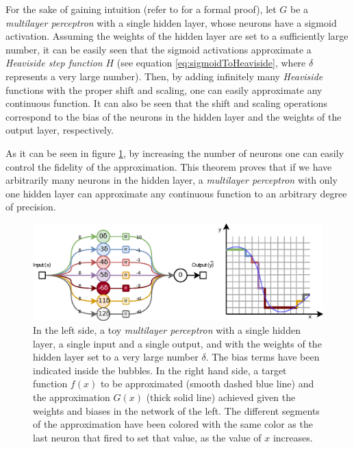 For the sake of gaining intuition (refer to \citealp{Cybenko1989} for a formal proof), let $G$ be a \textit{multilayer perceptron} with a single hidden layer, whose neurons have a sigmoid activation. Assuming the weights of the hidden layer are set to a sufficiently large number, it can be easily seen that the sigmoid activations approximate a \textit{Heaviside step function} $H$ (see equation \ref{eq:sigmoidToHeaviside}, where $\delta$ represents a very large number). Then, by adding infinitely many \textit{Heaviside} functions with the proper shift and scaling, one can easily approximate any continuous function. It can also be seen that the shift and scaling operations correspond to the bias of the neurons in the hidden layer and the weights of the output layer, respectively.

As it can be seen in figure \ref{fig:universalapprox}, by increasing the number of neurons one can easily control the fidelity of the approximation. This theorem proves that if we have arbitrarily many neurons in the hidden layer, a \textit{multilayer perceptron} with only one hidden layer can approximate any continuous function to an arbitrary degree of precision.


\begin{figure}[h!]
	\centering
	\includegraphics[width=1\linewidth]{background/images/universalapprox}
	\caption[Universal approximation theorem visual example]{In the left side, a toy \textit{multilayer perceptron} with a single hidden layer, a single input and a single output, and with the weights of the hidden layer set to a very large number $\delta$. The bias terms have been indicated inside the bubbles. In the right hand side, a target function $f(x)$ to be approximated (smooth dashed blue line) and the approximation $G(x)$ (thick solid line) achieved given the weights and biases in the network of the left. The different segments of the approximation have been colored with the same color as the last neuron that fired to set that value, as the value of $x$ increases.}
	\label{fig:universalapprox}
\end{figure}

